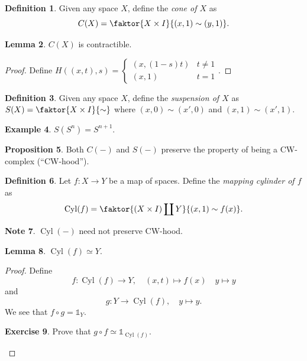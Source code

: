 \documentclass[10pt,letterpaper,cm]{nupset}
\theoremstyle{definition}
\newtheorem{definition}{Definition}[subsection]
\newtheorem{exmp}[definition]{Example}
\newtheorem{note}[definition]{Note}
\theoremstyle{theorem}
\newtheorem{lemma}[definition]{Lemma}
\newtheorem{prop}[definition]{Proposition}
\newtheorem{exercise}[definition]{Exercise}
\theoremstyle{remark}
\newcommand{\1}{\mathbb{1}}
\newcommand{\0}{\vec 0}
\DeclareMathOperator{\cyl}{Cyl}
\begin{document}
\begin{definition}
Given any space $X$, define the \textit{cone of $X$} as $$C(X) = \faktor{X\times I}{(x,1) \sim (y,1)}.   $$
\end{definition}
\begin{lemma}
$C(X)$ is contractible.
\end{lemma}
\begin{proof}
Define $H((x,t), s) = \begin{cases} (x, (1-s)t) & t\ne 1 \\ (x,1) & t=1
\end{cases}.$
\end{proof}

\begin{definition}
Given any space $X$, define the \textit{suspension of $X$} as $S(X) =\faktor{X\times I}{\sim}$ where $(x,0) \sim (x', 0)$ and $(x,1) \sim (x', 1)$. 
\end{definition}
\begin{exmp}
$S(S^n) = S^{n+1}.$
\end{exmp}

\begin{prop}
Both $C(-)$ and $S(-)$ preserve the property of being a CW-complex (``CW-hood'').
\end{prop}

\begin{definition}
Let $f: X \to Y$ be a map of spaces. Define the \textit{mapping cylinder of $f$} as $$\cyl(f) = \faktor{(X\times I) \coprod Y}{(x, 1) \sim f(x)}.$$
\end{definition}
\begin{note}
$\cyl(-)$ need not preserve CW-hood.
\end{note}
\begin{lemma}
$\cyl(f) \simeq Y$.
\end{lemma}
\begin{proof}
Define $$f: \cyl(f) \to Y, \quad (x,t) \mapsto f(x) \quad y \mapsto y$$ and
$$ g: Y \to \cyl(f), \quad y \mapsto y . $$ We see that $f\circ g = \mathbb{1}_Y$.
\begin{exercise}
Prove that $g\circ f \simeq \mathbb{1}_{\cyl(f)}$.
\end{exercise}
\end{proof}
\end{document}
